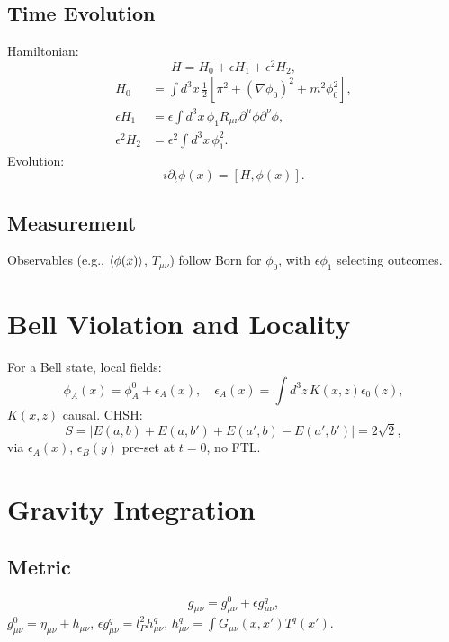\documentclass{article}
\begin{document}
\subsection{Time Evolution}
Hamiltonian:
\begin{equation}
H = H_0 + \epsilon H_1 + \epsilon^2 H_2,
\end{equation}
\begin{align}
H_0 &= \int d^3x \, \frac{1}{2} [\pi^2 + (\nabla \phi_0)^2 + m^2 \phi_0^2], \\
\epsilon H_1 &= \epsilon \int d^3x \, \phi_1 R_{\mu\nu} \partial^\mu \phi \partial^\nu \phi, \\
\epsilon^2 H_2 &= \epsilon^2 \int d^3x \, \phi_1^2.
\end{align}
Evolution:
\begin{equation}
i \partial_t \phi(x) = [H, \phi(x)].
\end{equation}

\subsection{Measurement}
Observables (e.g., \(\ev{\phi(x)}\), \(T_{\mu\nu}\)) follow Born for \(\phi_0\), with \(\epsilon \phi_1\) selecting outcomes.

\section{Bell Violation and Locality}
For a Bell state, local fields:
\begin{equation}
\phi_A(x) = \phi_A^0 + \epsilon_A(x), \quad \epsilon_A(x) = \int d^3z \, K(x,z) \epsilon_0(z),
\end{equation}
\(K(x,z)\) causal. CHSH:
\begin{equation}
S = |E(a,b) + E(a,b') + E(a',b) - E(a',b')| = 2\sqrt{2},
\end{equation}
via \(\epsilon_A(x)\), \(\epsilon_B(y)\) pre-set at \(t=0\), no FTL.

\section{Gravity Integration}
\subsection{Metric}
\begin{equation}
g_{\mu\nu} = g_{\mu\nu}^0 + \epsilon g_{\mu\nu}^q,
\end{equation}
\(g_{\mu\nu}^0 = \eta_{\mu\nu} + h_{\mu\nu}\), \(\epsilon g_{\mu\nu}^q = l_P^2 h_{\mu\nu}^q\), \(h_{\mu\nu}^q = \int G_{\mu\nu}(x,x') T^q(x')\).
\end{document}
